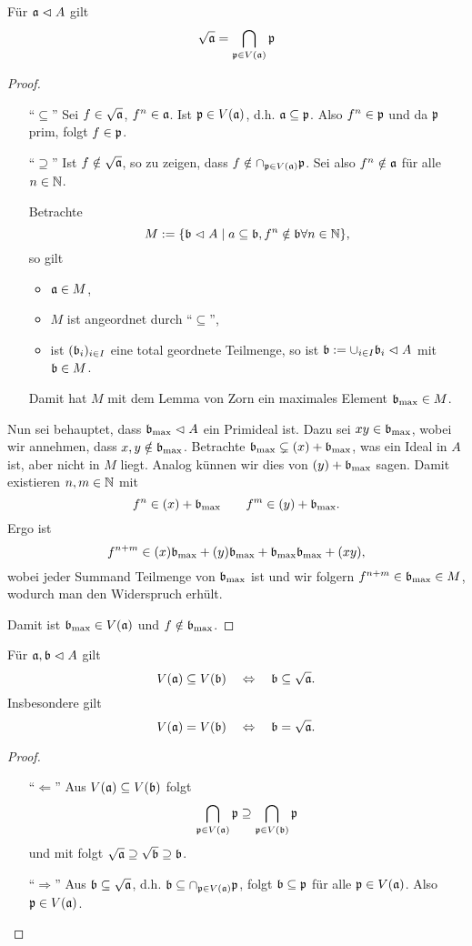 \begin{lemma}
	\label{lemma:radikal ist schnitt}
	Für $\mathfrak{a} \vartriangleleft A$ gilt
	\[
		\sqrt{\mathfrak{a}} = \bigcap_{\mathfrak{p}\in V(\mathfrak{a})} \mathfrak{p}
	\]
\end{lemma}
\begin{proof}
	  \newcommand{\bmax}{\b_\text{max}}
	\begin{itemize}
	  \item["`$\subseteq$"']
	  	Sei $f \in \sqrt{\mathfrak{a}}$, $f^n \in \mathfrak{a}$. Ist $\mathfrak{p} \in V(\mathfrak{a})$, d.h.
	  	$\mathfrak{a} \subseteq\mathfrak{p}$. Also
	  	$f^n \in \mathfrak{p}$ und da $\mathfrak{p}$ prim, folgt $f\in \mathfrak{p}$.
	  \item["`$\supseteq$"']
	  	Ist $f\notin \sqrt{\mathfrak{a}}$, so zu zeigen, dass 
	  	$f \notin \cap_{\mathfrak{p}\in V(\mathfrak{a})} \mathfrak{p}$.
	  	Sei also 
	  	$f^n \notin \mathfrak{a}$ für alle $n\in \mathbb{N}$.
	  	
	  	Betrachte
	  	\[ M := \{\mathfrak{b} \vartriangleleft A\mid a\subseteq \mathfrak{b},
	  		f^n \notin \mathfrak{b} \forall n\in \mathbb{N}\},
	  	\]
	  	so gilt
	  	\begin{itemize}
	  	  \item $\mathfrak{a} \in M$,
	  	  \item $M$ ist angeordnet durch "`$\subseteq$"',
	  	  \item ist $(\mathfrak{b}_i)_{i\in I}$ eine total geordnete Teilmenge,
	  	  	so ist $\mathfrak{b}:= \cup_{i\in I} \mathfrak{b}_i \vartriangleleft A$ mit $\mathfrak{b} \in M$.
	  	\end{itemize}
	  	Damit hat $M$ mit dem Lemma von Zorn ein maximales Element
	  	$\bmax \in M$.
	\end{itemize}
	Nun sei behauptet, dass $\bmax \ideal A$ ein Primideal ist.
	Dazu sei $xy \in \bmax$, wobei wir annehmen, dass 
	$x,y \notin \bmax$.
	Betrachte
	$\bmax \subsetneq (x) + \bmax$, was ein Ideal in $A$ ist, aber nicht 
	in $M$ liegt. Analog künnen wir dies von $(y) + \bmax$ sagen. Damit
	existieren $n,m \in \mathbb{N}$ mit
	\[
		f^n \in (x) + \bmax
		\qquad
		f^m \in (y) + \bmax.
	\]
	Ergo ist
	\[
		f^{n+m} \in
			(x)\bmax + (y)\bmax + \bmax\bmax + (xy),
	\]
	wobei jeder Summand Teilmenge von $\bmax$ ist und wir folgern
	$f^{n+m} \in \bmax \in M$, wodurch man den Widerspruch erhült.
	
	Damit ist $\bmax \in V(\a)$ und $f\notin \bmax$. 
\end{proof}

\begin{satz}
	\label{satz:v und radikal}
	Für $\mathfrak{a}, \mathfrak{b} \vartriangleleft A$ gilt
	\[ V(\mathfrak{a}) \subseteq V(\mathfrak{b}) \quad\Leftrightarrow\quad
		\mathfrak{b} \subseteq \sqrt{\mathfrak{a}}.
	\]
	Insbesondere gilt
	\[ V(\mathfrak{a}) = V(\mathfrak{b}) \quad\Leftrightarrow\quad
		\mathfrak{b} = \sqrt{\mathfrak{a}}.
	\]
\end{satz}
\begin{proof}
	\begin{itemize}
	  \item["`$\Leftarrow$"']
	  	Aus $V(\mathfrak{a}) \subseteq V(\mathfrak{b})$ folgt
	  	\[
	  		\bigcap_{\mathfrak{p} \in V(\mathfrak{a})} \mathfrak{p} 
	  		\supseteq \bigcap_{\mathfrak{p}\in V(\mathfrak{b})} \mathfrak{p}
	  	\]
	  	und mit 
	  	folgt $\sqrt {\mathfrak{a}} \supseteq \sqrt{\mathfrak{b}} \supseteq \mathfrak{b}$.
	  \item["`$\Rightarrow$"']
	  	Aus $\mathfrak{b} \subseteq \sqrt{\mathfrak{a}}$, d.h.
	  	$\mathfrak{b} \subseteq \cap_{\mathfrak{p}\in V(\mathfrak{a})} \mathfrak{p}$, folgt
	  	$\mathfrak{b} \subseteq \mathfrak{p}$ für alle $\mathfrak{p}\in V(\mathfrak{a})$.
	  	Also $\mathfrak{p} \in V(\mathfrak{a})$.
	\end{itemize}
\end{proof}


